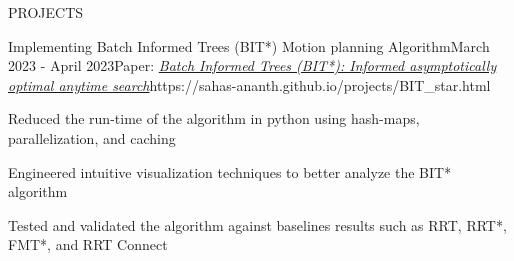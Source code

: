 \documentclass{resume} %
\begin{document}
\begin{rSection}{PROJECTS}
	\begin{rProjExpDetails}{Implementing Batch Informed Trees (BIT*) Motion planning Algorithm}{}{March 2023 - April 2023}{Paper: \href{https://journals.sagepub.com/doi/pdf/10.1177/0278364919890396}{\textit{Batch Informed Trees (BIT*): Informed asymptotically optimal anytime search}}}{https://sahas-ananth.github.io/projects/BIT_star.html}{}
		\item Reduced the run-time of the algorithm in python using hash-maps, parallelization, and caching
		\item Engineered intuitive visualization techniques to better analyze the BIT* algorithm
		\item Tested and validated the algorithm against baselines results such as RRT, RRT*, FMT*, and RRT Connect
	\end{rProjExpDetails}

\end{rSection}
\end{document}
